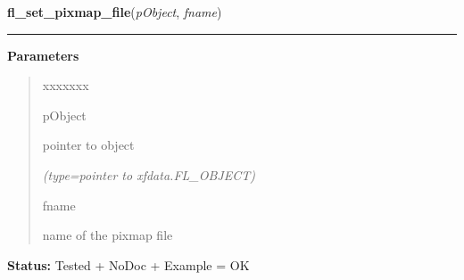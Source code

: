 \hspace{.8\funcindent}\begin{boxedminipage}{\funcwidth}

    \raggedright \textbf{fl\_set\_pixmap\_file}(\textit{pObject}, \textit{fname})

    \vspace{-1.5ex}

    \rule{\textwidth}{0.5\fboxrule}
\setlength{\parskip}{2ex}
\setlength{\parskip}{1ex}
      \textbf{Parameters}
      \vspace{-1ex}

      \begin{quote}
        \begin{Ventry}{xxxxxxx}

          \item[pObject]

          pointer to object

            {\it (type=pointer to xfdata.FL\_OBJECT)}

          \item[fname]

          name of the pixmap file

        \end{Ventry}

      \end{quote}

\textbf{Status:} Tested + NoDoc + Example = OK



    \end{boxedminipage}

    \label{xformslib:library:fl_set_pixmap_file}

    \vspace{0.5ex}

